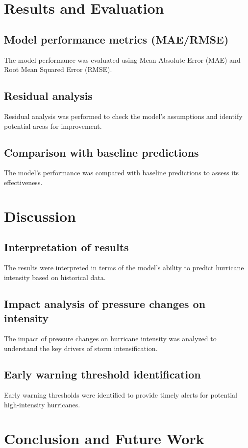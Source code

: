 \documentclass{article}
\begin{document}
	\section{Results and Evaluation}
	\subsection{Model performance metrics (MAE/RMSE)}
	The model performance was evaluated using Mean Absolute Error (MAE) and Root Mean Squared Error (RMSE).
	
	\subsection{Residual analysis}
	Residual analysis was performed to check the model's assumptions and identify potential areas for improvement.
	
	\subsection{Comparison with baseline predictions}
	The model's performance was compared with baseline predictions to assess its effectiveness.
	
	\section{Discussion}
	\subsection{Interpretation of results}
	The results were interpreted in terms of the model's ability to predict hurricane intensity based on historical data.
	
	\subsection{Impact analysis of pressure changes on intensity}
	The impact of pressure changes on hurricane intensity was analyzed to understand the key drivers of storm intensification.
	
	\subsection{Early warning threshold identification}
	Early warning thresholds were identified to provide timely alerts for potential high-intensity hurricanes.
	
	\section{Conclusion and Future Work}
\end{document}
